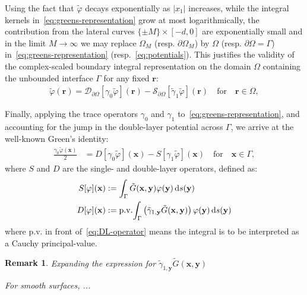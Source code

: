 \documentclass[11pt]{article}
\newcommand{\bx}{\mathbf{x}}
\newcommand{\by}{\mathbf{y}}
\newcommand{\br}{\boldsymbol{r}}
\newcommand{\de}{\,\mathrm{d}}
\newcommand{\tvarphi}{\tilde \varphi}
\newtheorem{remark}[theorem]{Remark}
\begin{document}
Using the fact that $\tvarphi$ decays exponentially as $|x_1|$ increases, while
the integral kernels in~\cref{eq:greens-representation} grow at most
logarithmically, the contribution from the lateral curves $\{ \pm M\} \times
[-d,0]$ are exponentially small and in the limit $M \to \infty$ we may replace
$\Omega_M$ (resp. $\partial \Omega_M$) by $\Omega$ (resp. $\partial \Omega =
\Gamma$) in~\cref{eq:greens-representation} (resp.~\cref{eq:potentials}). This
justifies the validity of the complex-scaled boundary integral representation on
the domain $\Omega$ containing the unbounded interface $\Gamma$ for any fixed $\br$:
\begin{align}
  \label{eq:greens-representation}
  \tvarphi(\br) = \mathcal{D}_{\partial \Omega}[\gamma_0\tvarphi](\br) - \mathcal{S}_{\partial \Omega}[\tilde{\gamma}_1 {\tvarphi}](\br) \quad \mbox{for} \quad \br \in \Omega,
\end{align}

Finally, applying the trace operators $\gamma_0$ and $\gamma_1$
to~\cref{eq:greens-representation}, and accounting for the jump in the
double-layer potential across $\Gamma$, we arrive at the well-known Green's
identity:
\begin{align}
  \label{eq:greens-formula}
  \frac{\gamma_0 \tvarphi(\bx)}{2} &=  D[\gamma_0 \tvarphi](\bx) - S[{\gamma}_1 \tvarphi](\bx) \quad \mbox{for} \quad \bx \in \Gamma,
\end{align}
where $S$ and $D$ are the single- and double-layer operators,
defined as:
\begin{subequations}
  \label{eq:calderon-operators}
  \begin{align}
  \label{eq:SL-operator}  
  S[\varphi](\bx) &:= \int_\Gamma \tilde{G}(\bx,\by) \varphi(\by) \de s(\by)\\
  \label{eq:DL-operator}  
  D[\varphi](\bx) &:= {\rm p.v.}\! \int_\Gamma\left(\tilde{\gamma}_{1,\by}\tilde{G}(\bx,\by)\right)
  \varphi(\by) \de s(\by)
\end{align}\label{eq:BIOS}\end{subequations}
where p.v. in front of~\cref{eq:DL-operator} means the integral is to be
interpreted as a Cauchy principal-value.

\begin{remark}
  Expanding the expression for $\tilde{\gamma}_{1,\by} \tilde{G}(\bx,\by)$ 
  
  For smooth surfaces, ...
\end{remark}
\end{document}
